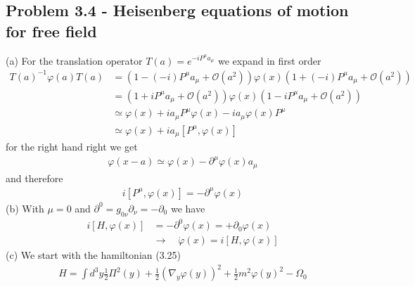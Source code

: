\documentclass[10pt,a4paper]{book}
\theoremstyle{definition}
\begin{document}
\subsection{Problem 3.4 - Heisenberg equations of motion for free field}
(a) For the translation operator $T(a)=e^{-iP^\mu a_\mu}$ we expand in first order
\begin{align}
T(a)^{-1}\varphi(a)T(a)
&=\left(1-(-i)P^\mu a_\mu+\mathcal{O}(a^2)\right)\varphi(x)\left(1+(-i)P^\mu a_\mu+\mathcal{O}(a^2)\right)\\
&=\left(1+iP^\mu a_\mu+\mathcal{O}(a^2)\right)\varphi(x)\left(1-iP^\mu a_\mu+\mathcal{O}(a^2)\right)\\
&\simeq\varphi(x)+ia_\mu P^\mu\varphi(x)-ia_\mu\varphi(x)P^\mu\\
&\simeq\varphi(x)+ia_\mu [P^\mu,\varphi(x)]
\end{align}
for the right hand right we get
\begin{align}
\varphi(x-a)\simeq\varphi(x)-\partial^\mu \varphi(x)a_\mu
\end{align}
and therefore
\begin{align}
i[P^\mu,\varphi(x)]=-\partial^\mu\varphi(x)
\end{align}
(b) With $\mu=0$ and $\partial^0=g_{0\nu}\partial_\nu=-\partial_0$ we have
\begin{align}
i[H,\varphi(x)]&=-\partial^0\varphi(x)=+\partial_0\varphi(x)\\
&\rightarrow\quad\dot{\varphi}(x)=i[H,\varphi(x)]
\end{align}
(c) We start with the hamiltonian (3.25)
\begin{align}
H=\int d^3y\frac{1}{2}\Pi^2(y)+\frac{1}{2}(\nabla_y\varphi(y))^2+\frac{1}{2}m^2\varphi(y)^2-\Omega_0
\end{align}
\end{document}

